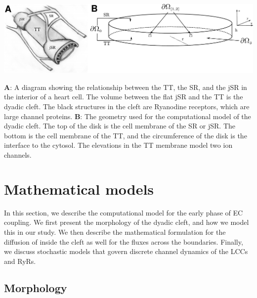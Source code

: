 \begin{figurewithlongcaption}
\label{fig:hake:morphology}
  \centering
  \includegraphics[width=\largefig]{chapters/hake/pdf/morphology}
  \caption[The dyadic cleft]{\textbf{A}: A diagram showing the
    relationship between the TT, the SR, and the jSR in the interior
    of a heart cell. The volume between the flat jSR and the TT is the
    dyadic cleft. The black structures in the cleft are Ryanodine
    receptors, which are large channel proteins. \textbf{B}: The
    geometry used for the computational model of the dyadic cleft. The
    top of the disk is the cell membrane of the SR or jSR. The bottom
    is the cell membrane of the TT, and the circumference of the disk
    is the interface to the cytosol. The elevations in the TT membrane
    model two \Ca ion channels.}
\end{figurewithlongcaption}

\section{Mathematical models}
\label{sec:hake:mathematical-models}

In this section, we describe the computational model for the early
phase of EC coupling. We first present the morphology of the dyadic
cleft, and how we model this in our study. We then describe the
mathematical formulation for the diffusion of \Ca inside the cleft as
well for the \Ca fluxes across the boundaries. Finally, we discuss
stochastic models that govern discrete channel dynamics of the LCCs
and RyRs.

\subsection{Morphology}
\label{sec:hake:morphology}
  

